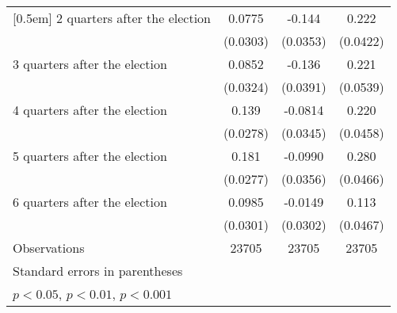 \begin{table}[!ht]
\begin{tabular}{l*{3}{c}}
[0.5em]
 2 quarters after the election&      0.0775\sym{*}  &      -0.144\sym{***}&       0.222\sym{***}\\
                    &    (0.0303)         &    (0.0353)         &    (0.0422)         \\
[0.5em]
 3 quarters after the election&      0.0852\sym{**} &      -0.136\sym{***}&       0.221\sym{***}\\
                    &    (0.0324)         &    (0.0391)         &    (0.0539)         \\
[0.5em]
 4 quarters after the election&       0.139\sym{***}&     -0.0814\sym{*}  &       0.220\sym{***}\\
                    &    (0.0278)         &    (0.0345)         &    (0.0458)         \\
[0.5em]
 5 quarters after the election&       0.181\sym{***}&     -0.0990\sym{**} &       0.280\sym{***}\\
                    &    (0.0277)         &    (0.0356)         &    (0.0466)         \\
[0.5em]
 6 quarters after the election&      0.0985\sym{**} &     -0.0149         &       0.113\sym{*}  \\
                    &    (0.0301)         &    (0.0302)         &    (0.0467)         \\
\hline
Observations        &       23705         &       23705         &       23705         \\
\hline\hline
\multicolumn{4}{l}{\footnotesize Standard errors in parentheses}\\
\multicolumn{4}{l}{\footnotesize \sym{*} \(p<0.05\), \sym{**} \(p<0.01\), \sym{***} \(p<0.001\)}\\
\end{tabular}
\end{table}
